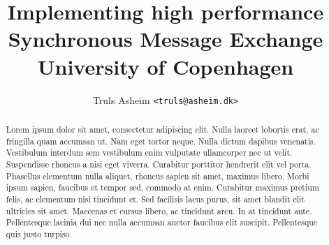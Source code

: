 \documentclass[a4paper,11pt]{memoir}
\title{Implementing high performance Synchronous Message Exchange\\
       University of Copenhagen}
\author{Truls Asheim \texttt{<truls@asheim.dk>}}
\date{}
\theoremstyle{definition}
\begin{document}
\begin{titlingpage}
\maketitle
\end{titlingpage}


\begin{abstract}
  Lorem ipsum dolor sit amet, consectetur adipiscing elit. Nulla
  laoreet lobortis erat, ac fringilla quam accumsan ut. Nam eget
  tortor neque. Nulla dictum dapibus venenatis. Vestibulum interdum
  sem vestibulum enim vulputate ullamcorper nec ut velit. Suspendisse
  rhoncus a nisi eget viverra. Curabitur porttitor hendrerit elit vel
  porta. Phasellus elementum nulla aliquet, rhoncus sapien sit amet,
  maximus libero. Morbi ipsum sapien, faucibus et tempor sed, commodo
  at enim. Curabitur maximus pretium felis, ac elementum nisi
  tincidunt et. Sed facilisis lacus purus, sit amet blandit elit
  ultricies sit amet. Maecenas et cursus libero, ac tincidunt arcu. In
  at tincidunt ante. Pellentesque lacinia dui nec nulla accumsan
  auctor faucibus elit suscipit. Pellentesque quis justo turpiso.
\end{abstract}

\clearpage
\tableofcontents\clearpage
\listoffigures




%



\printbibliography

\appendix

\end{document}
